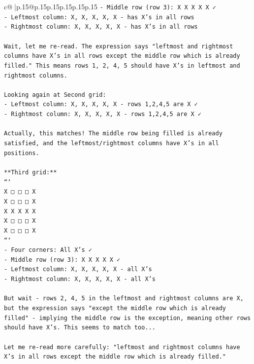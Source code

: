\documentclass{article}
\begin{document}
{\begin{supertabular}{c@{$\;$}|p{.15\linewidth}@{}p{.15\linewidth}p{.15\linewidth}p{.15\linewidth}p{.15\linewidth}p{.15\linewidth}}
{{{\texttt{{-} Middle row (row 3): X X X X X ✓} \\
\texttt{{-} Leftmost column: X, X, X, X, X {-} has X's in all rows} \\
\texttt{{-} Rightmost column: X, X, X, X, X {-} has X's in all rows} \\
\\ 
\texttt{Wait, let me re{-}read. The expression says "leftmost and rightmost columns have X's in all rows except the middle row which is already filled." This means rows 1, 2, 4, 5 should have X's in leftmost and rightmost columns.} \\
\\ 
\texttt{Looking again at Second grid:} \\
\texttt{{-} Leftmost column: X, X, X, X, X {-} rows 1,2,4,5 are X ✓} \\
\texttt{{-} Rightmost column: X, X, X, X, X {-} rows 1,2,4,5 are X ✓} \\
\\ 
\texttt{Actually, this matches! The middle row being filled is already satisfied, and the leftmost/rightmost columns have X's in all positions.} \\
\\ 
\texttt{**Third grid:**} \\
\texttt{```} \\
\texttt{X □ □ □ X} \\
\texttt{X □ □ □ X} \\
\texttt{X X X X X} \\
\texttt{X □ □ □ X} \\
\texttt{X □ □ □ X} \\
\texttt{```} \\
\texttt{{-} Four corners: All X's ✓} \\
\texttt{{-} Middle row (row 3): X X X X X ✓} \\
\texttt{{-} Leftmost column: X, X, X, X, X {-} all X's} \\
\texttt{{-} Rightmost column: X, X, X, X, X {-} all X's} \\
\\ 
\texttt{But wait {-} rows 2, 4, 5 in the leftmost and rightmost columns are X, but the expression says "except the middle row which is already filled" {-} implying the middle row is the exception, meaning other rows should have X's. This seems to match too...} \\
\\ 
\texttt{Let me re{-}read more carefully: "leftmost and rightmost columns have X's in all rows except the middle row which is already filled."} \\
}}}
\end{supertabular}}
\end{document}
